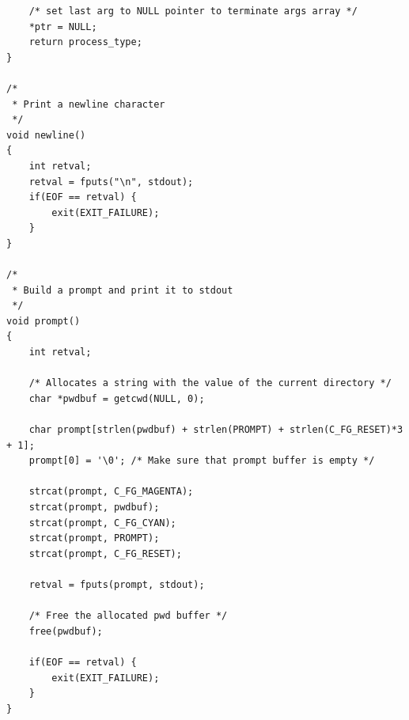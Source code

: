\documentclass[paper=a4, fontsize=11pt]{scrartcl} %
\numberwithin{equation}{section} %
\numberwithin{figure}{section} %
\numberwithin{table}{section} %
\begin{document}
\begin{verbatim}
    /* set last arg to NULL pointer to terminate args array */
    *ptr = NULL;
    return process_type;
}

/*
 * Print a newline character
 */
void newline()
{
    int retval;
    retval = fputs("\n", stdout);
    if(EOF == retval) {
        exit(EXIT_FAILURE);
    }
}

/*
 * Build a prompt and print it to stdout
 */
void prompt()
{
    int retval;

    /* Allocates a string with the value of the current directory */
    char *pwdbuf = getcwd(NULL, 0);

    char prompt[strlen(pwdbuf) + strlen(PROMPT) + strlen(C_FG_RESET)*3 + 1];
    prompt[0] = '\0'; /* Make sure that prompt buffer is empty */

    strcat(prompt, C_FG_MAGENTA);
    strcat(prompt, pwdbuf);
    strcat(prompt, C_FG_CYAN);
    strcat(prompt, PROMPT);
    strcat(prompt, C_FG_RESET);

    retval = fputs(prompt, stdout);

    /* Free the allocated pwd buffer */
    free(pwdbuf);

    if(EOF == retval) {
        exit(EXIT_FAILURE);
    }
}

\end{verbatim}

\end{document}
